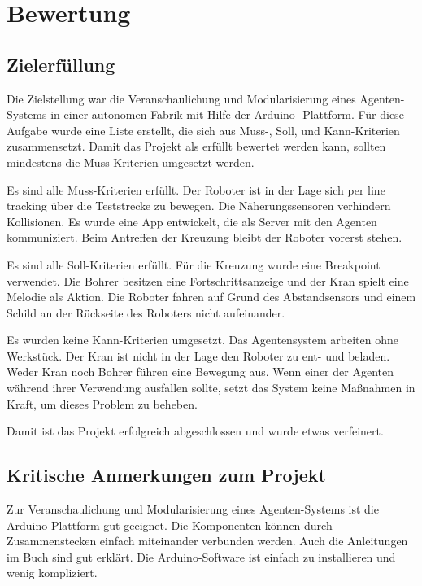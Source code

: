 \chapter{Bewertung}


\section{Zielerfüllung}

Die Zielstellung war die Veranschaulichung und Modularisierung eines Agenten-Systems in einer autonomen Fabrik mit Hilfe der Arduino- Plattform. Für diese Aufgabe wurde eine Liste erstellt, die sich aus Muss-, Soll, und Kann-Kriterien zusammensetzt. Damit das Projekt als erfüllt bewertet werden kann, sollten mindestens die Muss-Kriterien umgesetzt werden.

Es sind alle Muss-Kriterien erfüllt. Der Roboter ist in der Lage sich per line tracking über die Teststrecke zu bewegen. Die Näherungssensoren verhindern Kollisionen. Es wurde eine App entwickelt, die als Server mit den Agenten kommuniziert. Beim Antreffen der Kreuzung bleibt der Roboter vorerst stehen.

Es sind alle Soll-Kriterien erfüllt. Für die Kreuzung wurde eine Breakpoint verwendet. Die Bohrer besitzen eine Fortschrittsanzeige und der Kran spielt eine Melodie als Aktion. Die Roboter fahren auf Grund des Abstandsensors und einem Schild an der Rückseite des Roboters nicht aufeinander.

Es wurden keine Kann-Kriterien umgesetzt. Das Agentensystem arbeiten ohne Werkstück. Der Kran ist nicht in der Lage den Roboter zu ent- und beladen. Weder Kran noch Bohrer führen eine Bewegung aus. Wenn einer der Agenten während ihrer Verwendung ausfallen sollte, setzt das System keine Maßnahmen in Kraft, um dieses Problem zu beheben.

Damit ist das Projekt erfolgreich abgeschlossen und wurde etwas verfeinert.

\section{Kritische Anmerkungen zum Projekt}

Zur Veranschaulichung und Modularisierung eines Agenten-Systems ist die Arduino-Plattform gut geeignet. Die Komponenten können durch Zusammenstecken einfach miteinander verbunden werden. Auch die Anleitungen im Buch sind gut erklärt. Die Arduino-Software ist einfach zu installieren und wenig kompliziert.

